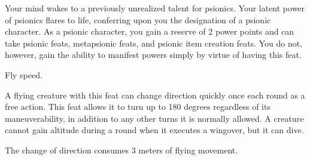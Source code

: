 {Your mind wakes to a previously unrealized talent for psionics.}{}
{Your latent power of psionics flares to life, conferring upon you the designation of a psionic character. As a psionic character, you gain a reserve of 2 power points and can take psionic feats, metapsionic feats, and psionic item creation feats. You do not, however, gain the ability to manifest powers simply by virtue of having this feat.}{}{}

{Fly speed.}
{A flying creature with this feat can change direction quickly once each round as a free action. This feat allows it to turn up to 180 degrees regardless of its maneuverability, in addition to any other turns it is normally allowed. A creature cannot gain altitude during a round when it executes a wingover, but it can dive.

The change of direction consumes 3 meters of flying movement.}